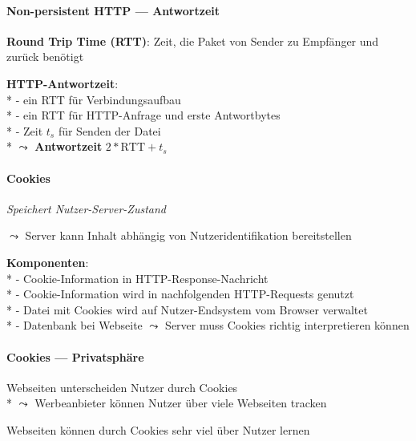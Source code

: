 \paragraph{Non-persistent HTTP --- Antwortzeit}
\begin{items}
  \item \textbf{Round Trip Time (RTT)}: Zeit, die Paket von Sender zu Empfänger und zurück benötigt
  \item \textbf{HTTP-Antwortzeit}: \\*
    - ein RTT für Verbindungsaufbau \\*
    - ein RTT für HTTP-Anfrage und erste Antwortbytes \\*
    - Zeit \( t_s \) für Senden der Datei \\*
    \phantom{-} \( \leadsto \) \textbf{Antwortzeit} \( 2*\text{RTT} + t_s \) 
\end{items}

\paragraph{Cookies}
\begin{items}
  \item \emph{Speichert Nutzer-Server-Zustand}
  \item \( \leadsto \) Server kann Inhalt abhängig von Nutzeridentifikation bereitstellen
  \item \textbf{Komponenten}: \\*
    - Cookie-Information in HTTP-Response-Nachricht \\*
    - Cookie-Information wird in nachfolgenden HTTP-Requests genutzt \\*
    - Datei mit Cookies wird auf Nutzer-Endsystem vom Browser verwaltet \\*
    - Datenbank bei Webseite \( \leadsto \) Server muss Cookies richtig interpretieren können
\end{items}

\paragraph{Cookies --- Privatsphäre}
\begin{items}
  \item Webseiten unterscheiden Nutzer durch Cookies \\*
    \( \leadsto \) Werbeanbieter können Nutzer über viele Webseiten tracken
  \item Webseiten können durch Cookies sehr viel über Nutzer lernen
\end{items}

